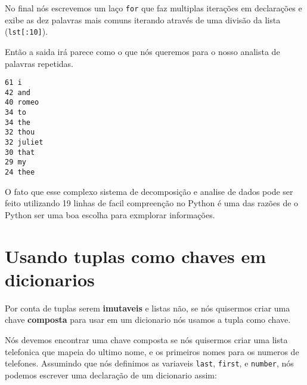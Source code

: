 No final nós escrevemos um laço {\tt for} que faz multiplas
iterações em declarações e exibe as dez palavras mais comuns iterando
através de uma divisão da lista ({\tt lst[:10]}).

Então a saida irá parece como o que nós queremos para o nosso
analista de palavras repetidas.

\beforeverb
\begin{verbatim}
61 i
42 and
40 romeo
34 to
34 the
32 thou
32 juliet
30 that
29 my
24 thee
\end{verbatim}
\afterverb
%
O fato que esse complexo sistema de decomposição e analise de dados
pode ser feito utilizando 19 linhas de facil compreenção no Python
é uma das razões de o Python ser uma boa escolha para
exmplorar informações.

\section{Usando tuplas como chaves em dicionarios}


Por conta de tuplas serem {\bf imutaveis} e listas não, se nós quisermos
criar uma chave {\bf composta} para usar em um dicionario nós usamos a 
tupla como chave.

Nós devemos encontrar uma chave composta se nós quisermos criar
uma lista telefonica que mapeia do ultimo nome, e os primeiros nomes
para os numeros de telefones. Assumindo que nós definimos as
variaveis {\tt last}, {\tt first}, e {\tt number}, nós podemos
escrever uma declaração de um dicionario assim:

